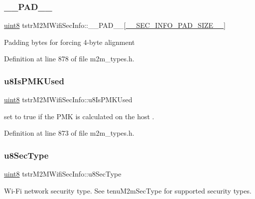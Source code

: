 \subsubsection{\texorpdfstring{\+\_\+\+\_\+\+P\+A\+D\+\_\+\+\_\+}{\_\_PAD\_\_}}
{\footnotesize\ttfamily \hyperlink{group__DataT_ga4df709a77647e870bbf1d955b8edc9a6}{uint8} tstr\+M2\+M\+Wifi\+Sec\+Info\+::\+\_\+\+\_\+\+P\+A\+D\+\_\+\+\_\+\mbox{[}\hyperlink{m2m__types_8h_a6d1f0ba36c9711cd0f57f6d10677a994}{\+\_\+\+\_\+\+S\+E\+C\+\_\+\+I\+N\+F\+O\+\_\+\+P\+A\+D\+\_\+\+S\+I\+Z\+E\+\_\+\+\_\+}\mbox{]}}

Padding bytes for forcing 4-\/byte alignment 

Definition at line 878 of file m2m\+\_\+types.\+h.

\mbox{\label{structtstrM2MWifiSecInfo_acd91f409d3ade8e74232ed8c28df6e15}} 
\subsubsection{\texorpdfstring{u8\+Is\+P\+M\+K\+Used}{u8IsPMKUsed}}
{\footnotesize\ttfamily \hyperlink{group__DataT_ga4df709a77647e870bbf1d955b8edc9a6}{uint8} tstr\+M2\+M\+Wifi\+Sec\+Info\+::u8\+Is\+P\+M\+K\+Used}

set to true if the P\+MK is calculated on the host . 

Definition at line 873 of file m2m\+\_\+types.\+h.

\mbox{\label{structtstrM2MWifiSecInfo_a22de34616e189f348274276e57d9d909}} 
\subsubsection{\texorpdfstring{u8\+Sec\+Type}{u8SecType}}
{\footnotesize\ttfamily \hyperlink{group__DataT_ga4df709a77647e870bbf1d955b8edc9a6}{uint8} tstr\+M2\+M\+Wifi\+Sec\+Info\+::u8\+Sec\+Type}

Wi-\/\+Fi network security type. See tenu\+M2m\+Sec\+Type for supported security types. 

